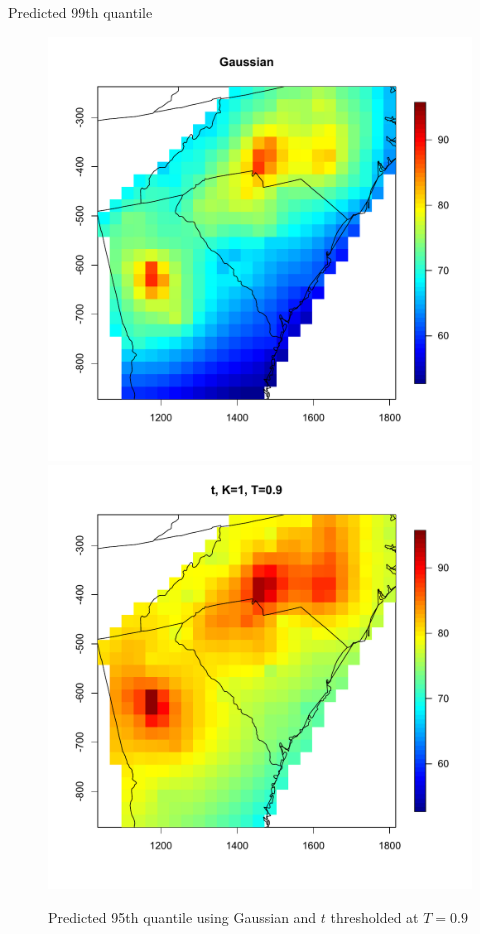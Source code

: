 \documentclass{beamer}
\begin{document}
\begin{frame}{Predicted 99th quantile}
\centering
\begin{figure}
    \includegraphics[width=.5\linewidth]{./plots/quantile-99-gau.pdf}
    \includegraphics[width=.5\linewidth]{./plots/quantile-99-t19.pdf}
    \caption{Predicted 95th quantile using Gaussian and $t$ thresholded at $T=0.9$}
\end{figure}
\end{frame}
\end{document}
